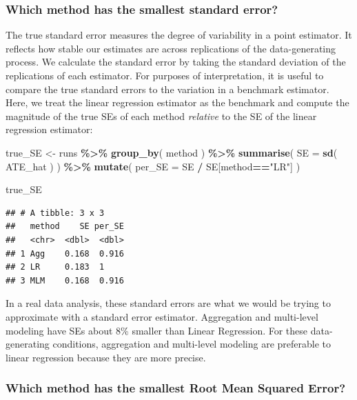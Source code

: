 \documentclass[
]{book}
\newenvironment{Shaded}{\begin{snugshade}}{\end{snugshade}}
\newcommand{\AttributeTok}[1]{\textcolor[rgb]{0.13,0.29,0.53}{#1}}
\newcommand{\FunctionTok}[1]{\textcolor[rgb]{0.13,0.29,0.53}{\textbf{#1}}}
\newcommand{\NormalTok}[1]{#1}
\newcommand{\OtherTok}[1]{\textcolor[rgb]{0.56,0.35,0.01}{#1}}
\newcommand{\SpecialCharTok}[1]{\textcolor[rgb]{0.81,0.36,0.00}{\textbf{#1}}}
\newcommand{\StringTok}[1]{\textcolor[rgb]{0.31,0.60,0.02}{#1}}
\begin{document}
\subsubsection*{Which method has the smallest standard error?}\label{which-method-has-the-smallest-standard-error}

The true standard error measures the degree of variability in a point estimator.
It reflects how stable our estimates are across replications of the data-generating process.
We calculate the standard error by taking the standard deviation of the replications of each estimator.
For purposes of interpretation, it is useful to compare the true standard errors to the variation in a benchmark estimator.
Here, we treat the linear regression estimator as the benchmark and compute the magnitude of the true SEs of each method \emph{relative} to the SE of the linear regression estimator:

\begin{Shaded}
\begin{Highlighting}[]
\NormalTok{true\_SE }\OtherTok{\textless{}{-}} 
\NormalTok{  runs }\SpecialCharTok{\%\textgreater{}\%} 
  \FunctionTok{group\_by}\NormalTok{( method ) }\SpecialCharTok{\%\textgreater{}\%}
  \FunctionTok{summarise}\NormalTok{( }
    \AttributeTok{SE =} \FunctionTok{sd}\NormalTok{( ATE\_hat )}
\NormalTok{  ) }\SpecialCharTok{\%\textgreater{}\%}
  \FunctionTok{mutate}\NormalTok{( }
    \AttributeTok{per\_SE =}\NormalTok{ SE }\SpecialCharTok{/}\NormalTok{ SE[method}\SpecialCharTok{==}\StringTok{"LR"}\NormalTok{] }
\NormalTok{  )}

\NormalTok{true\_SE}
\end{Highlighting}
\end{Shaded}

\begin{verbatim}
## # A tibble: 3 x 3
##   method    SE per_SE
##   <chr>  <dbl>  <dbl>
## 1 Agg    0.168  0.916
## 2 LR     0.183  1    
## 3 MLM    0.168  0.916
\end{verbatim}

In a real data analysis, these standard errors are what we would be trying to approximate with a standard error estimator.
Aggregation and multi-level modeling have SEs about 8\% smaller than Linear Regression.
For these data-generating conditions, aggregation and multi-level modeling are preferable to linear regression because they are more precise.

\subsubsection*{Which method has the smallest Root Mean Squared Error?}\label{which-method-has-the-smallest-root-mean-squared-error}
\end{document}

